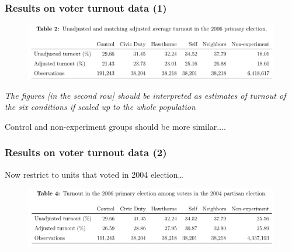 


\begin{frame}
  \frametitle{Results on voter turnout data (1)}
  
  \begin{figure}[ht]    
    \centering
    \includegraphics[width=0.99\textwidth]{figures/saevje-table2.png}
  \end{figure}

  \footnotesize{\emph{The figures [in the second row] should be
      interpreted as estimates of turnout of the six conditions if
      scaled up to the whole population}}

  \normalsize

  \medskip 

  Control and non-experiment groups should be more similar....
  
\end{frame}


\begin{frame}
  \frametitle{Results on voter turnout data (2)}

  Now restrict to units that voted in 2004 election\ldots

  \medskip 

  \begin{figure}[ht]    
    \centering
    \includegraphics[width=0.99\textwidth]{figures/saevje-table4.png}
  \end{figure}


\end{frame}



